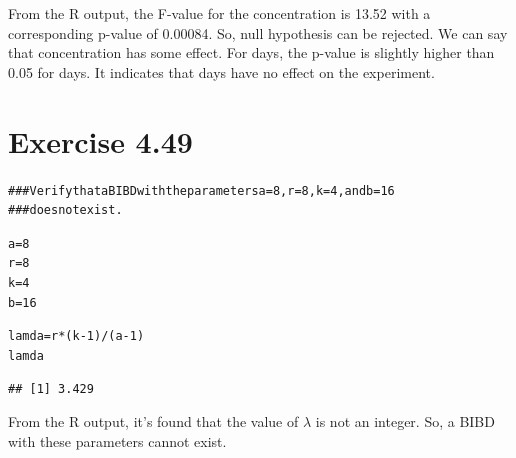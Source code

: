 \documentclass[a4paper]{article}\usepackage{graphicx, color}
\makeatletter
\newcommand{\hlcomment}[1]{\textcolor[rgb]{0.180392156862745,0.6,0.341176470588235}{#1}}%
\newenvironment{kframe}{%
 \def\at@end@of@kframe{}%
 \ifinner\ifhmode%
  \def\at@end@of@kframe{\end{minipage}}%
  \begin{minipage}{\columnwidth}%
 \fi\fi%
 \def\FrameCommand##1{\hskip\@totalleftmargin \hskip-\fboxsep
 \colorbox{shadecolor}{##1}\hskip-\fboxsep
     \hskip-\linewidth \hskip-\@totalleftmargin \hskip\columnwidth}%
 \MakeFramed {\advance\hsize-\width
   \@totalleftmargin\z@ \linewidth\hsize
   \@setminipage}}%
 {\par\unskip\endMakeFramed%
 \at@end@of@kframe}
\newenvironment{knitrout}{}{} %
\makeatother
\begin{document}
From the R output, the F-value for the concentration is 13.52 with a corresponding p-value of 0.00084. So, null hypothesis can be rejected. We can say that concentration has some effect. For days, the p-value is slightly higher than 0.05 for days. It indicates that days have no effect on the experiment.


\vspace{4 mm}

\section{ Exercise 4.49}

\begin{knitrout}
\color{fgcolor}\begin{kframe}
\begin{alltt}
\hlcomment{### Verify that a BIBD with the parameters a =8, r =8, k =4, and b =16}
\hlcomment{### does not exist.}

a = 8
r = 8
k = 4
b = 16

lamda = r * (k - 1)/(a - 1)
lamda
\end{alltt}
\begin{verbatim}
## [1] 3.429
\end{verbatim}
\end{kframe}
\end{knitrout}


From the R output, it's found that the value of $\lambda$ is not an integer. So, a BIBD with these parameters cannot exist.
\end{document}
